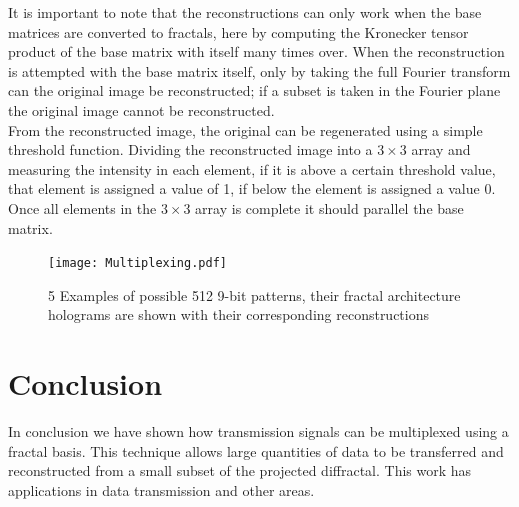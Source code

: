 It is important to note that the reconstructions can only work when the base matrices are converted to fractals, here by computing the Kronecker tensor product of the base matrix with itself many times over. When the reconstruction is attempted with the base matrix itself, only by taking the full Fourier transform can the original image be reconstructed; if a subset is taken in the Fourier plane the original image cannot be reconstructed. \\
From the reconstructed image, the original can be regenerated using a simple threshold function. Dividing the reconstructed image into a $3\times 3$ array and measuring the intensity in each element, if it is above a certain threshold value, that element is assigned a value of 1, if below the element is assigned a value 0. Once all elements in the $3\times 3$ array is complete it should parallel the base matrix.
\begin{figure}[!ht]
\texttt{[image: Multiplexing.pdf]}
\caption{5 Examples of possible 512 9-bit patterns, their fractal architecture holograms are shown with their corresponding reconstructions}
\label{Multiplex}
\end{figure}
\section{Conclusion}
In conclusion we have shown how transmission signals can be multiplexed using a fractal basis. This technique allows large quantities of data to be transferred and reconstructed from a small subset of the projected diffractal. This work has applications in data transmission and other areas.